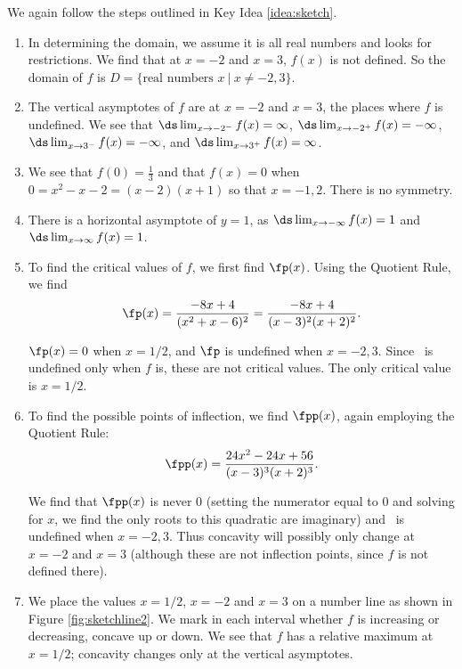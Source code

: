 {We again follow the steps outlined in Key Idea \ref{idea:sketch}.

\begin{enumerate}
		\item	In determining the domain, we assume it is all real numbers and looks for restrictions. We find that at $x=-2$ and $x=3$, $f(x)$ is not defined. So the domain of $f$ is $D = \{\text{real numbers } x\ | \ x\neq -2,3\}$.
		
		\item	The vertical asymptotes of $f$ are at $x=-2$ and $x=3$, the places where $f$ is undefined.  We see that $\ds\lim_{x\to-2^-}f(x)=\infty$, $\ds\lim_{x\to-2^+}f(x)=-\infty$, $\ds\lim_{x\to3^-}f(x)=-\infty$, and $\ds\lim_{x\to3^+}f(x)=\infty$.
		
		\item	We see that $f(0)=\frac13$ and that $f(x)=0$ when $0=x^2-x-2=(x-2)(x+1)$ so that $x=-1,2$.  There is no symmetry.

		\item	There is a horizontal asymptote of $y=1$, as $\ds \lim_{x\to -\infty}f(x) = 1$ and $\ds\lim_{x\to\infty}f(x) =1$.
		
		\item	To find the critical values of $f$, we first find $\fp(x)$. Using the Quotient Rule, we find $$\fp(x) = \frac{-8x+4}{(x^2+x-6)^2} = \frac{-8x+4}{(x-3)^2(x+2)^2}.$$
		
		$\fp(x) = 0$ when $x = 1/2$, and $\fp$ is undefined when $x=-2,3$. Since \fp\ is undefined only when $f$ is, these are not critical values. The only critical value is $x=1/2$.
		
		\item	To find the possible points of inflection, we find $\fpp(x)$, again employing the Quotient Rule: $$\fpp(x) = \frac{24x^2-24x+56}{(x-3)^3(x+2)^3}.$$
		
		We find that $\fpp(x)$ is never 0 (setting the numerator equal to 0 and solving for $x$, we find the only roots to this quadratic are imaginary) and \fpp\ is undefined when $x=-2,3$. Thus concavity will possibly only change at $x=-2$ and $x=3$ (although these are not inflection points, since $f$ is not defined there).
		
		\item	We place the values $x=1/2$, $x=-2$ and $x=3$ on a number line as shown in Figure \ref{fig:sketchline2}. We mark in each interval whether $f$ is increasing or decreasing, concave up or down. We see that $f$ has a relative maximum at $x=1/2$; concavity changes only at the vertical asymptotes.
		

\end{enumerate}}
